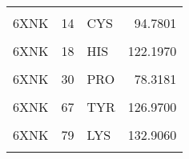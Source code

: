 \begin{table}
\begin{tabular}{lrlr}
			\cellcolor{gray!6}{6WZA} & \cellcolor{gray!6}{98} & \cellcolor{gray!6}{CYS} & \cellcolor{gray!6}{89.2313}\\
			6XNK & 14 & CYS & 94.7801\\
			\cellcolor{gray!6}{6XNK} & \cellcolor{gray!6}{17} & \cellcolor{gray!6}{CYS} & \cellcolor{gray!6}{129.1390}\\
			\addlinespace
			6XNK & 18 & HIS & 122.1970\\
			\cellcolor{gray!6}{6XNK} & \cellcolor{gray!6}{28} & \cellcolor{gray!6}{THR} & \cellcolor{gray!6}{95.9136}\\
			6XNK & 30 & PRO & 78.3181\\
			\cellcolor{gray!6}{6XNK} & \cellcolor{gray!6}{32} & \cellcolor{gray!6}{LEU} & \cellcolor{gray!6}{119.5620}\\
			6XNK & 67 & TYR & 126.9700\\
			\addlinespace
			\cellcolor{gray!6}{6XNK} & \cellcolor{gray!6}{75} & \cellcolor{gray!6}{ILE} & \cellcolor{gray!6}{119.2950}\\
			6XNK & 79 & LYS & 132.9060\\
			\cellcolor{gray!6}{6XNK} & \cellcolor{gray!6}{83} & \cellcolor{gray!6}{VAL} & \cellcolor{gray!6}{114.6820}\\
			\bottomrule
		\end{tabular}
	\end{table}
